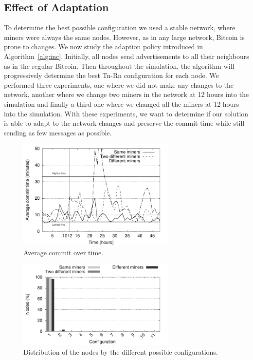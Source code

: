 \subsection{Effect of Adaptation}
To determine the best possible configuration we used a stable network, where miners were always the same nodes. However, as in any large network, Bitcoin is prone to changes.
We now study the adaption policy introduced in Algorithm~\ref{alg:inc}.
Initially, all nodes send advertisements to all their neighbours as in the regular Bitcoin. Then throughout the simulation, the algorithm will progressively determine the best Tn-Rn configuration for each node. We performed three experiments, one where we did not make any changes to the network, another where we change two miners in the network at 12 hours into the simulation and finally a third one where we changed all the miners at 12 hours into the simulation. With these experiments, we want to determine if our solution is able to adapt to the network changes and preserve the commit time while still sending as few messages as possible.

\begin{figure}
\centering
\includegraphics[width=0.7\textwidth]{plots/commit_over_time.pdf}
\caption{Average commit over time.}
\label{fig:commit-over-time}
\end{figure}

\begin{figure}
\centering
\includegraphics[width=0.7\textwidth]{plots/nodes_per_config.pdf}
\caption{Distribution of the nodes by the different possible configurations.}
\label{fig:node-per-conf}
\end{figure}

